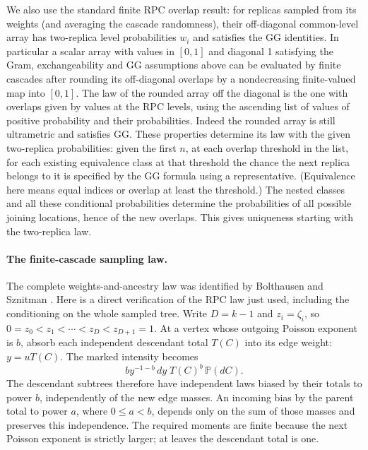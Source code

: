 \documentclass[11pt]{article}
\begin{document}
We also use the standard finite RPC overlap result: for replicas sampled from its weights (and averaging the cascade randomness), their off-diagonal common-level array has two-replica level probabilities $w_i$ and satisfies the GG identities. In particular a scalar array with values in $[0,1]$ and diagonal 1 satisfying the Gram, exchangeability and GG assumptions above can be evaluated by finite cascades after rounding its off-diagonal overlaps by a nondecreasing finite-valued map into $[0,1]$. The law of the rounded array off the diagonal is the one with overlaps given by values at the RPC levels, using the ascending list of values of positive probability and their probabilities. Indeed the rounded array is still ultrametric and satisfies GG. These properties determine its law with the given two-replica probabilities: given the first $n$, at each overlap threshold in the list, for each existing equivalence class at that threshold the chance the next replica belongs to it is specified by the GG formula using a representative. (Equivalence here means equal indices or overlap at least the threshold.) The nested classes and all these conditional probabilities determine the probabilities of all possible joining locations, hence of the new overlaps. This gives uniqueness starting with the two-replica law.

\paragraph{The finite-cascade sampling law.}
The complete weights-and-ancestry law was identified by Bolthausen and
Sznitman \cite[Theorem~2.2 and Proposition~1.4]{BolthausenSznitman1998}.
Here is a direct verification of the RPC law just used, including the
conditioning on the whole sampled tree. Write $D=k-1$ and $z_i=\zeta_i$,
so $0=z_0<z_1<\cdots<z_D<z_{D+1}=1$.
At a vertex whose outgoing Poisson exponent is $b$, absorb each independent
descendant total $T(C)$ into its edge weight: $y=uT(C)$. The marked intensity
becomes
\[
 b y^{-1-b}\,dy\;T(C)^b\,\mathbb P(dC).
\]
The descendant subtrees therefore have independent laws biased by their
totals to power $b$, independently of the new edge masses. An incoming
bias by the parent total to power $a$, where $0\le a<b$, depends only on
the sum of those masses and preserves this independence. The required
moments are finite because the next Poisson exponent is strictly larger;
at leaves the descendant total is one.
\end{document}

